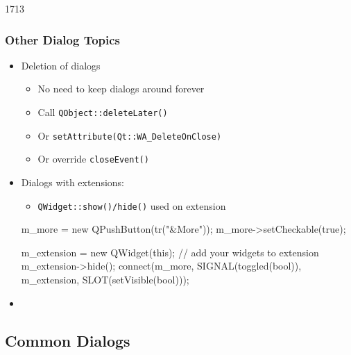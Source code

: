 \begin{slide}[fragile]{1713}
  \frametitle{Other Dialog Topics}
 \begin{itemize}
  \item Deletion of dialogs
    \begin{itemize}
    \item No need to keep dialogs around forever
    \item Call \texttt{QObject::deleteLater()}
    \item Or \texttt{setAttribute(Qt::WA\_DeleteOnClose)}
    \item Or override \texttt{closeEvent()}
   \end{itemize}
 \item Dialogs with extensions:
    \begin{itemize}
    \item \texttt{QWidget::show()/hide()} used on extension
    \end{itemize}
   \begin{cpp}
m_more = new QPushButton(tr("&More"));
m_more->setCheckable(true);
    \end{cpp}
   \begin{cpp}
m_extension = new QWidget(this);
// add your widgets to extension
m_extension->hide();
connect(m_more, SIGNAL(toggled(bool)), 
  m_extension, SLOT(setVisible(bool)));
      \end{cpp}
    \item {}
  \end{itemize}
\end{slide}


\subsection{Common Dialogs}

